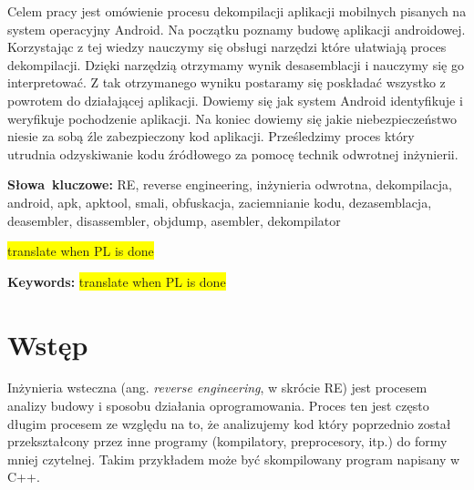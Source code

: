 \documentclass[12pt,a4paper,leqno,oneside,titlepage]{book}
\newenvironment{abstractpage}
  {\cleardoublepage\vspace*{\fill}\thispagestyle{empty}}
  {\vfill\cleardoublepage}
\newenvironment{abstract}[1]
  {\bigskip\selectlanguage{#1}%
   \begin{center}\bfseries\abstractname\end{center}}
  {\par\bigskip}
\newcommand{\todo}[1]{\colorbox{yellow}{#1}}
\begin{document}
\begin{abstractpage}
\begin{abstract}{polish}
Celem pracy jest omówienie procesu dekompilacji aplikacji mobilnych pisanych na system operacyjny Android.
Na początku poznamy budowę aplikacji androidowej. Korzystając z tej wiedzy nauczymy się obsługi narzędzi które ułatwiają proces dekompilacji. Dzięki narzędzią otrzymamy wynik desasemblacji i nauczymy się go interpretować. Z tak otrzymanego wyniku postaramy się poskładać wszystko z powrotem do działającej aplikacji. Dowiemy się jak system Android identyfikuje i weryfikuje pochodzenie aplikacji. Na koniec dowiemy się jakie niebezpieczeństwo niesie za sobą źle zabezpieczony kod aplikacji. Prześledzimy proces który utrudnia odzyskiwanie kodu źródłowego za pomocę technik odwrotnej inżynierii.
 
\end{abstract}
\smallskip
\noindent \textbf{Słowa~kluczowe:} RE, reverse engineering, inżynieria odwrotna, dekompilacja, android, apk, apktool, smali, obfuskacja, zaciemnianie kodu, dezasemblacja, deasembler, disassembler, objdump, asembler, dekompilator

\begin{abstract}{english}
\todo{translate when PL is done}
\end{abstract}
\smallskip
\noindent \textbf{Keywords:} \todo{translate when PL is done}
\end{abstractpage}

\mainmatter


\chapter*{Wstęp}

Inżynieria wsteczna (ang. \emph{reverse engineering}, w skrócie RE) jest procesem analizy budowy i sposobu działania oprogramowania. Proces ten jest często długim procesem ze względu na to, że analizujemy kod który poprzednio został przekształcony przez inne programy (kompilatory, preprocesory, itp.) do formy mniej czytelnej. Takim przykładem może być skompilowany program napisany w C++.
\end{document}
